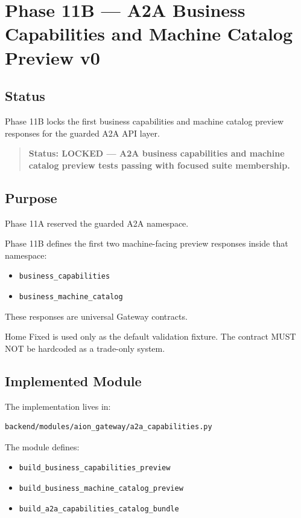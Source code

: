 \section{Phase 11B --- A2A Business Capabilities and Machine Catalog Preview v0}
\label{sec:aion-a2a-capabilities-catalog-preview-v0}

\subsection{Status}

Phase 11B locks the first business capabilities and machine catalog preview responses for the guarded A2A API layer.

\begin{quote}
\textbf{Status: LOCKED --- A2A business capabilities and machine catalog preview tests passing with focused suite membership.}
\end{quote}

\subsection{Purpose}

Phase 11A reserved the guarded A2A namespace.

Phase 11B defines the first two machine-facing preview responses inside that namespace:

\begin{itemize}
  \item \texttt{business\_capabilities}
  \item \texttt{business\_machine\_catalog}
\end{itemize}

These responses are universal Gateway contracts.

Home Fixed is used only as the default validation fixture. The contract MUST NOT be hardcoded as a trade-only system.

\subsection{Implemented Module}

The implementation lives in:

\begin{verbatim}
backend/modules/aion_gateway/a2a_capabilities.py
\end{verbatim}

The module defines:

\begin{itemize}
  \item \texttt{build\_business\_capabilities\_preview}
  \item \texttt{build\_business\_machine\_catalog\_preview}
  \item \texttt{build\_a2a\_capabilities\_catalog\_bundle}
\end{itemize}

